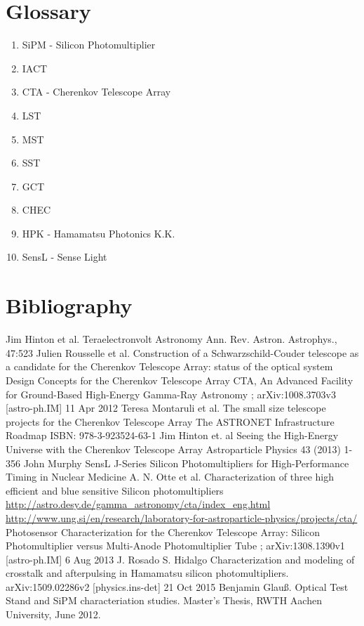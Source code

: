 \documentclass[12pt,article,type=msc,colorback,accentcolor=tud9c]{tudthesis}
\begin{document}
{\section{\Large Glossary}
\begin{enumerate}
\item SiPM - Silicon Photomultiplier
\item IACT
\item CTA - Cherenkov Telescope Array
\item LST
\item MST
\item SST
\item GCT
\item CHEC



\item HPK - Hamamatsu Photonics K.K.
\item SensL - Sense Light
\end{enumerate}


\newpage
\section{\Large Bibliography}
\begin{thebibliography}{12}

 Jim Hinton et al. Teraelectronvolt Astronomy Ann. Rev. Astron. Astrophys., 47:523
 Julien Rousselle et al. Construction of a Schwarzschild-Couder telescope as a candidate for the Cherenkov Telescope Array: status of the optical system
 Design Concepts for the Cherenkov Telescope Array CTA, An Advanced Facility for Ground-Based High-Energy Gamma-Ray Astronomy ; arXiv:1008.3703v3 [astro-ph.IM] 11 Apr 2012
 Teresa Montaruli et al. The small size telescope projects for the Cherenkov Telescope Array
 The ASTRONET Infrastructure Roadmap ISBN: 978-3-923524-63-1
 Jim Hinton et. al Seeing the High-Energy Universe with the Cherenkov Telescope Array Astroparticle Physics 43 (2013) 1-356 
 John Murphy SensL J-Series Silicon Photomultipliers for High-Performance Timing in Nuclear Medicine 
 A. N. Otte et al. Characterization of three high efficient and blue sensitive Silicon photomultipliers
\url{http://astro.desy.de/gamma_astronomy/cta/index_eng.html}
\url{http://www.ung.si/en/research/laboratory-for-astroparticle-physics/projects/cta/}
 Photosensor Characterization for the Cherenkov Telescope Array: Silicon Photomultiplier versus Multi-Anode Photomultiplier Tube ; arXiv:1308.1390v1 [astro-ph.IM] 6 Aug 2013
 J. Rosado S. Hidalgo Characterization and modeling of crosstalk and afterpulsing in Hamamatsu silicon photomultipliers. arXiv:1509.02286v2 [physics.ins-det] 21 Oct 2015
 Benjamin Glauß. Optical Test Stand and SiPM characteriation studies. Master’s Thesis, RWTH Aachen University, June 2012.


\end{thebibliography}}
\end{document}
